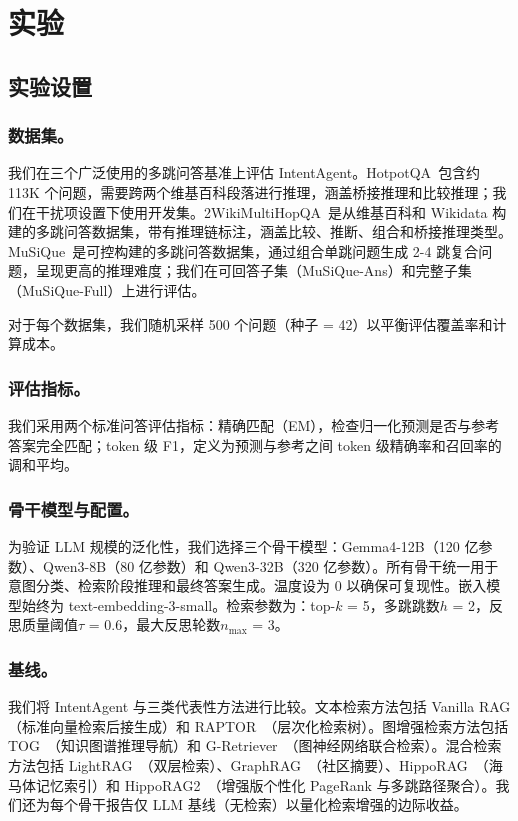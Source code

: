 \documentclass[runningheads]{llncs}
\begin{document}
\section{实验}

\subsection{实验设置}

\subsubsection{数据集。}

我们在三个广泛使用的多跳问答基准上评估 IntentAgent。HotpotQA~\cite{ref20}包含约 113K 个问题，需要跨两个维基百科段落进行推理，涵盖桥接推理和比较推理；我们在干扰项设置下使用开发集。2WikiMultiHopQA~\cite{ref21}是从维基百科和 Wikidata 构建的多跳问答数据集，带有推理链标注，涵盖比较、推断、组合和桥接推理类型。MuSiQue~\cite{ref22}是可控构建的多跳问答数据集，通过组合单跳问题生成 2-4 跳复合问题，呈现更高的推理难度；我们在可回答子集（MuSiQue-Ans）和完整子集（MuSiQue-Full）上进行评估。

对于每个数据集，我们随机采样 500 个问题（种子 = 42）以平衡评估覆盖率和计算成本。

\subsubsection{评估指标。}

我们采用两个标准问答评估指标：精确匹配（EM），检查归一化预测是否与参考答案完全匹配；token 级 F1，定义为预测与参考之间 token 级精确率和召回率的调和平均。

\subsubsection{骨干模型与配置。}

为验证 LLM 规模的泛化性，我们选择三个骨干模型：Gemma4-12B（120 亿参数）、Qwen3-8B（80 亿参数）和 Qwen3-32B（320 亿参数）。所有骨干统一用于意图分类、检索阶段推理和最终答案生成。温度设为 0 以确保可复现性。嵌入模型始终为 text-embedding-3-small。检索参数为：top-$k$ = 5，多跳跳数$h$ = 2，反思质量阈值$\tau$ = 0.6，最大反思轮数$n_{\max}$ = 3。

\subsubsection{基线。}

我们将 IntentAgent 与三类代表性方法进行比较。文本检索方法包括 Vanilla RAG（标准向量检索后接生成）和 RAPTOR~\cite{ref23}（层次化检索树）。图增强检索方法包括 TOG~\cite{ref24}（知识图谱推理导航）和 G-Retriever~\cite{ref25}（图神经网络联合检索）。混合检索方法包括 LightRAG~\cite{ref26}（双层检索）、GraphRAG~\cite{ref27}（社区摘要）、HippoRAG~\cite{ref28}（海马体记忆索引）和 HippoRAG2~\cite{ref30}（增强版个性化 PageRank 与多跳路径聚合）。我们还为每个骨干报告仅 LLM 基线（无检索）以量化检索增强的边际收益。
\end{document}
